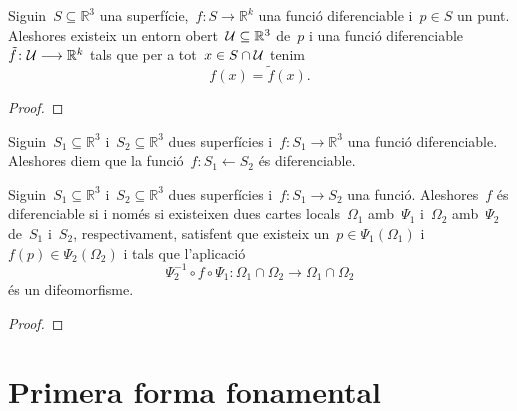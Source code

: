 \documentclass[../../main.tex]{subfiles}
\begin{document}
    \begin{proposition}
        \label{prop:per a tot punt i funció diferenciable d'una superfície podem trobar una segona funció diferenciable igual en un entorn del punt}
        Siguin~\(S\subseteq\mathbb{R}^{3}\) una superfície,~\(f\colon S\longrightarrow\mathbb{R}^{k}\) una funció diferenciable i~\(p\in S\) un punt.
        Aleshores  existeix un entorn obert~\(\mathcal{U}\subseteq\mathbb{R}^{3}\) de~\(p\) i una funció diferenciable~\(\tilde{f}\colon\mathcal{U}\longrightarrow\mathbb{R}^{k}\) tals que per a tot~\(x\in S\cap\mathcal{U}\) tenim
        \[
            f(x)=\tilde{f}(x).
        \]
        \begin{proof}
        \end{proof}
    \end{proposition}
    \begin{definition}
        \label{def:funció diferenciable entre superfícies}
        Siguin~\(S_{1}\subseteq\mathbb{R}^{3}\) i~\(S_{2}\subseteq\mathbb{R}^{3}\) dues superfícies i~\(f\colon S_{1}\longrightarrow\mathbb{R}^{3}\) una funció diferenciable.
        Aleshores diem que la funció~\(f\colon S_{1}\longleftarrow S_{2}\) és diferenciable.
    \end{definition}
    \begin{proposition}
        Siguin~\(S_{1}\subseteq\mathbb{R}^{3}\) i~\(S_{2}\subseteq\mathbb{R}^{3}\) dues superfícies i~\(f\colon S_{1}\longrightarrow S_{2}\) una funció.
        Aleshores~\(f\) és diferenciable si i només si existeixen dues cartes locals~\(\Omega_{1}\) amb~\(\Psi_{1}\) i~\(\Omega_{2}\) amb~\(\Psi_{2}\) de~\(S_{1}\) i~\(S_{2}\), respectivament, satisfent que existeix un~\(p\in\Psi_{1}(\Omega_{1})\) i~\(f(p)\in\Psi_{2}(\Omega_{2})\) i tals que l'aplicació
        \[
            \Psi_{2}^{-1}\circ f\circ \Psi_{1}\colon\Omega_{1}\cap\Omega_{2}\longrightarrow\Omega_{1}\cap\Omega_{2}
        \]
        és un difeomorfisme.
        \begin{proof}
        \end{proof}
    \end{proposition}
    \section{Primera forma fonamental}
\end{document}

